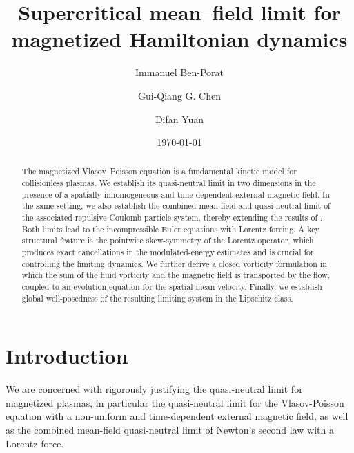 \documentclass[11pt,reqno]{amsart}
\numberwithin{equation}{section}
\begin{document}
\title[Supercritical Mean--field Limit]{Supercritical mean--field limit for magnetized Hamiltonian dynamics}
\author{Immanuel Ben-Porat}
\address{Immanuel Ben Porat, The University of Texas at Austin, Austin, TX 78712, USA.}

\author{Gui-Qiang G. Chen}
\address{Gui-Qiang G. Chen, Mathematical Institute, University of Oxford, Oxford OX2 6GG, UK.}



\author{Difan Yuan}
\address{Difan Yuan,
School of Mathematical Sciences and Laboratory of
Mathematics and Complex Systems, Beijing Normal University.}



\begin{abstract}
The magnetized Vlasov--Poisson equation is a fundamental kinetic model for collisionless plasmas. We establish its quasi-neutral limit in two dimensions in the presence of a spatially inhomogeneous and time-dependent external magnetic field. In the same setting, we also establish the combined mean-field and quasi-neutral limit of the associated repulsive Coulomb particle system, thereby extending the results of \cite{han2021newton}. Both limits lead to the incompressible Euler equations with Lorentz forcing. A key structural feature is the pointwise skew-symmetry of the Lorentz operator, which produces exact cancellations in the modulated-energy estimates and is crucial for controlling the limiting dynamics. We further derive a closed vorticity formulation in which the sum of the fluid vorticity and the magnetic field is transported by the flow, coupled to an evolution equation for the spatial mean velocity. Finally, we establish global 
well-posedness of the resulting limiting system in the Lipschitz class.
\end{abstract}

\date{\today}
\maketitle
\section{Introduction}
We are concerned with rigorously justifying the quasi-neutral limit for magnetized plasmas, in particular the quasi-neutral limit for the Vlasov-Poisson equation with a non-uniform and 
time-dependent external magnetic field, as well as the combined mean-field quasi-neutral 
limit of Newton's second law with a Lorentz force.
\end{document}
